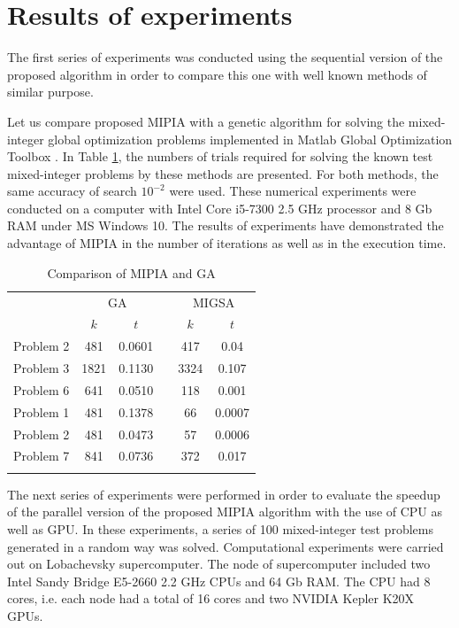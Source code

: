 \documentclass{llncs}
\begin{document}
\section{Results of experiments}
The first series of experiments was conducted using the sequential version of the proposed 
algorithm in order to compare this one with well known methods of similar purpose.

Let us compare proposed MIPIA with a genetic algorithm for solving the mixed-integer global 
optimization problems implemented in Matlab Global Optimization Toolbox \cite{Matlab}. In 
Table \ref{tab:1}, the numbers of trials required for solving the known test mixed-integer 
problems by these methods are presented. For both methods, the same accuracy of search 
$10^{-2}$ were used. These numerical experiments were conducted on a 
computer with Intel Core i5-7300 2.5 GHz processor and 8 Gb RAM under MS Windows 10. 
The results of experiments have demonstrated the advantage of MIPIA in the number 
of iterations as well as in the execution time.

\begin{table}
	\caption{Comparison of MIPIA and GA}
	\label{tab:1}
	\center
	\begin{tabular}{cccccc}
		\hline\noalign{\smallskip}
	\multirow{2}{*}{Test problem}	 & \multicolumn{2}{c}{ GA } & & 
\multicolumn{2}{c}{MIGSA} \\
		\noalign{\smallskip} \cline{2-3} \cline{5-6} \noalign{\smallskip}
		 & $k$ & $t$ & & $k$ & $t$  \\
		\noalign{\smallskip} \hline \noalign{\smallskip}
		 Problem 2 \cite{Floudas}&	481 &	0.0601 & &	417 &	0.04 \\
		 Problem 3 \cite{Floudas}& 	1821 &	0.1130 & & 3324 &	0.107 \\
		 Problem 6 \cite{Floudas}&	641 &	0.0510 & &	118 &	0.001 \\
		 Problem 1 \cite{Deep}   &	481 &	0.1378 & &	66 &	0.0007 \\
		 Problem 2 \cite{Deep}   &	481 &	0.0473 & &	57 &	0.0006 \\
		 Problem 7 \cite{Deep}   &	841 &	0.0736 & & 372	 &	0.017 \\
		\noalign{\smallskip}\hline
	\end{tabular}
\end{table}

The next series of experiments were performed in order to evaluate the speedup of the parallel 
version of the proposed MIPIA algorithm with the use of CPU as well as GPU. In these 
experiments, a series of 100 mixed-integer test problems generated in a random way was solved. 
Computational experiments were carried out on Lobachevsky supercomputer. The node of 
supercomputer included two Intel Sandy Bridge E5-2660 2.2 GHz CPUs and 64 Gb RAM. The 
CPU had 8 cores, i.e. each node had a total of 16 cores and two NVIDIA Kepler K20X GPUs. 
\end{document}
